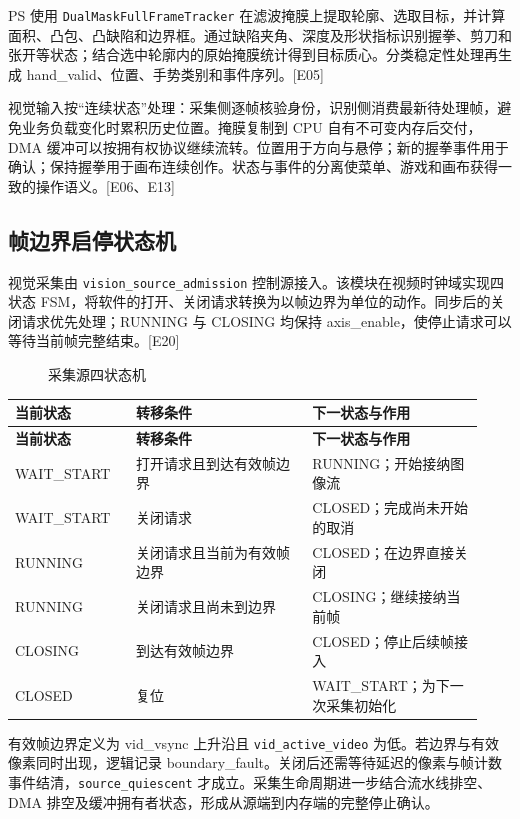 PS 使用 \nolinkurl{DualMaskFullFrameTracker} 在滤波掩膜上提取轮廓、选取目标，并计算面积、凸包、凸缺陷和边界框。通过缺陷夹角、深度及形状指标识别握拳、剪刀和张开等状态；结合选中轮廓内的原始掩膜统计得到目标质心。分类稳定性处理再生成 hand\_valid、位置、手势类别和事件序列。[E05]

视觉输入按“连续状态”处理：采集侧逐帧核验身份，识别侧消费最新待处理帧，避免业务负载变化时累积历史位置。掩膜复制到 CPU 自有不可变内存后交付，DMA 缓冲可以按拥有权协议继续流转。位置用于方向与悬停；新的握拳事件用于确认；保持握拳用于画布连续创作。状态与事件的分离使菜单、游戏和画布获得一致的操作语义。[E06、E13]

\subsection{帧边界启停状态机}
视觉采集由 \nolinkurl{vision_source_admission} 控制源接入。该模块在视频时钟域实现四状态 FSM，将软件的打开、关闭请求转换为以帧边界为单位的动作。同步后的关闭请求优先处理；RUNNING 与 CLOSING 均保持 axis\_enable，使停止请求可以等待当前帧完整结束。[E20]

\begin{figure}[htbp]\centering\caption{采集源四状态机}\label{fig:3}\end{figure}
{\small\renewcommand{\arraystretch}{1.28}
\begin{longtable}{@{}>{\raggedright\arraybackslash}p{0.24\linewidth}>{\raggedright\arraybackslash}p{0.35\linewidth}>{\raggedright\arraybackslash}p{0.34\linewidth}@{}}
\toprule
\bfseries 当前状态 & \bfseries 转移条件 & \bfseries 下一状态与作用\\\midrule
\endfirsthead
\toprule
\bfseries 当前状态 & \bfseries 转移条件 & \bfseries 下一状态与作用\\\midrule
\endhead
\bottomrule\endfoot
WAIT\_START & 打开请求且到达有效帧边界 & RUNNING；开始接纳图像流\\
WAIT\_START & 关闭请求 & CLOSED；完成尚未开始的取消\\
RUNNING & 关闭请求且当前为有效帧边界 & CLOSED；在边界直接关闭\\
RUNNING & 关闭请求且尚未到边界 & CLOSING；继续接纳当前帧\\
CLOSING & 到达有效帧边界 & CLOSED；停止后续帧接入\\
CLOSED & 复位 & WAIT\_START；为下一次采集初始化\\
\end{longtable}}
有效帧边界定义为 vid\_vsync 上升沿且 \nolinkurl{vid_active_video} 为低。若边界与有效像素同时出现，逻辑记录 boundary\_fault。关闭后还需等待延迟的像素与帧计数事件结清，\nolinkurl{source_quiescent} 才成立。采集生命周期进一步结合流水线排空、DMA 排空及缓冲拥有者状态，形成从源端到内存端的完整停止确认。

